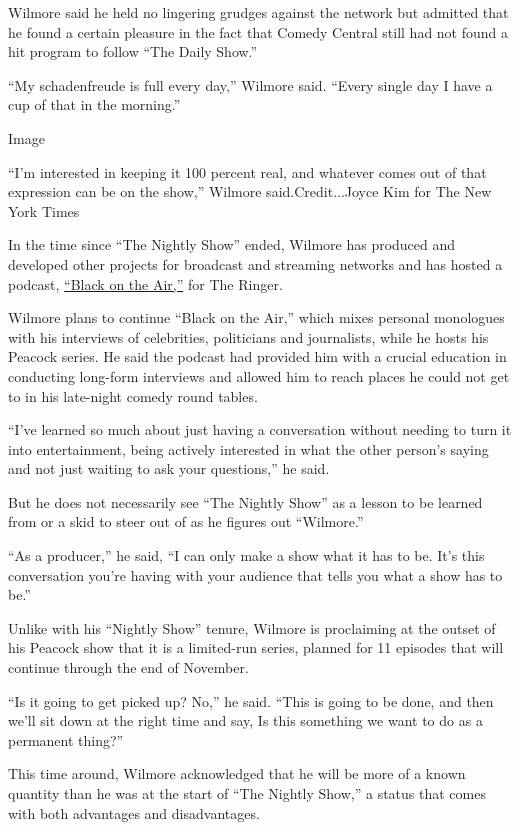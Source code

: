 Wilmore said he held no lingering grudges against the network but
admitted that he found a certain pleasure in the fact that Comedy
Central still had not found a hit program to follow ``The Daily Show.''

``My schadenfreude is full every day,'' Wilmore said. ``Every single day
I have a cup of that in the morning.''

Image

``I'm interested in keeping it 100 percent real, and whatever comes out
of that expression can be on the show,'' Wilmore said.Credit...Joyce Kim
for The New York Times

In the time since ``The Nightly Show'' ended, Wilmore has produced and
developed other projects for broadcast and streaming networks and has
hosted a podcast,
\href{https://www.theringer.com/larry-wilmore-black-on-air}{``Black on
the Air,''} for The Ringer.

Wilmore plans to continue ``Black on the Air,'' which mixes personal
monologues with his interviews of celebrities, politicians and
journalists, while he hosts his Peacock series. He said the podcast had
provided him with a crucial education in conducting long-form interviews
and allowed him to reach places he could not get to in his late-night
comedy round tables.

``I've learned so much about just having a conversation without needing
to turn it into entertainment, being actively interested in what the
other person's saying and not just waiting to ask your questions,'' he
said.

But he does not necessarily see ``The Nightly Show'' as a lesson to be
learned from or a skid to steer out of as he figures out ``Wilmore.''

``As a producer,'' he said, ``I can only make a show what it has to be.
It's this conversation you're having with your audience that tells you
what a show has to be.''

Unlike with his ``Nightly Show'' tenure, Wilmore is proclaiming at the
outset of his Peacock show that it is a limited-run series, planned for
11 episodes that will continue through the end of November.

``Is it going to get picked up? No,'' he said. ``This is going to be
done, and then we'll sit down at the right time and say, Is this
something we want to do as a permanent thing?''

This time around, Wilmore acknowledged that he will be more of a known
quantity than he was at the start of ``The Nightly Show,'' a status that
comes with both advantages and disadvantages.

